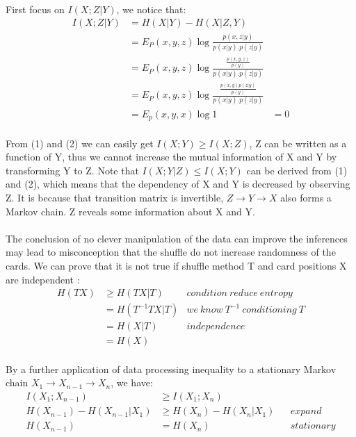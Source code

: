 \documentclass[a4paper, 11pt]{article} %
\begin{document}
\paragraph{}
First focus on $I(X;Z|Y)$, we notice that:
\begin{align*} 
I(X;Z|Y)&=H(X\vert Y)-H(X|Z,Y)\\
       &=E_P(x,y,z)\log \frac{p(x,z|y)}{p(x|y).p(z|y)}\\
       &=E_P(x,y,z)\log \frac{\frac{p(x,y,z)}{p(y)}}{p(x|y).p(z|y)}\\
       &=E_P(x,y,z)\log \frac{\frac{p(x,y)p(z|y)}{p(y)}}{p(x|y).p(z|y)}\\
       &=E_p(x,y,x)\log 1  
       &=0
 \end{align*}
\paragraph{}
From (1) and (2) we can easily get $I(X;Y)\geq I(X;Z)$, Z can be written as a function of Y, thus we cannot increase the mutual information of X and Y by transforming Y to Z. Note that $I(X;Y|Z)\leq I(X;Y)$ can be derived from (1) and (2), which means that the dependency of X and Y is decreased by observing Z. It is because that transition matrix is invertible, $Z\rightarrow Y\rightarrow X$ also forms a Markov chain. Z reveals some information about X and Y.
\paragraph{}
The conclusion of no clever manipulation of the data can improve the inferences may lead to misconception that the shuffle do not increase randomness of the cards. We can prove that it is not true if shuffle method T and card positions X are independent :
\begin{align*} 
H(TX)&\geq H(TX|T)&condition~reduce~entropy\\
       &=H(T^{-1}TX|T)&we~know~T^{-1}~conditioning~T\\
       &=H(X|T)&independence \\
       &=H(X)  
 \end{align*}
\paragraph{}
By a further application of data processing inequality to a stationary Markov chain $X_1\rightarrow X_{n-1}\rightarrow X_n$, we have: 
\begin{align*} 
I(X_1;X_{n-1})&\geq I(X_1;X_n)\\
H(X_{n-1})-H(X_{n-1}|X_1)&\geq H(X_{n})-H(X_{n}|X_1)&&expand\\ 
H(X_{n-1})&=H(X_{n})&&stationary
\end{align*}
\end{document}

